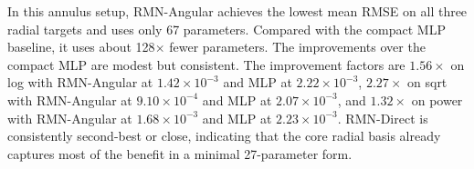 \documentclass[twoside,11pt]{article}
\begin{document}
\begin{table}[t]
	\centering
	\caption{Supplementary annulus study: RMSE comparison on radial targets. Values show mean $\pm$ std over 5 seeds. Best results are in bold and second-best results are underlined. Parameter counts shown in parentheses.}
	\label{tab:app_annulus_results}

\end{table}

In this annulus setup, RMN-Angular achieves the lowest mean RMSE on all three radial targets and uses only 67 parameters. Compared with the compact MLP baseline, it uses about 128$\times$ fewer parameters. The improvements over the compact MLP are modest but consistent. The improvement factors are $1.56\times$ on log with RMN-Angular at $1.42\times 10^{-3}$ and MLP at $2.22\times 10^{-3}$, $2.27\times$ on sqrt with RMN-Angular at $9.10\times 10^{-4}$ and MLP at $2.07\times 10^{-3}$, and $1.32\times$ on power with RMN-Angular at $1.68\times 10^{-3}$ and MLP at $2.23\times 10^{-3}$. RMN-Direct is consistently second-best or close, indicating that the core radial basis already captures most of the benefit in a minimal 27-parameter form.
\end{document}
